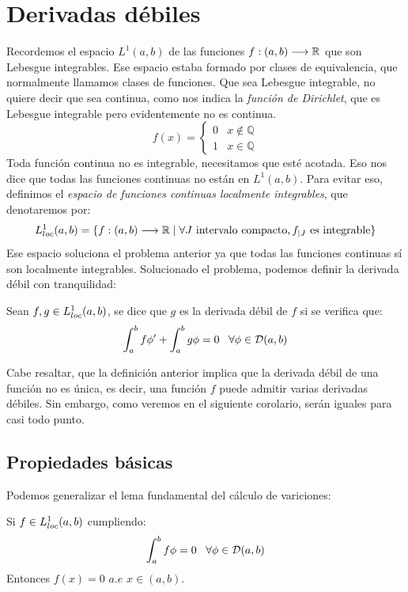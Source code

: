 \chapter{Derivadas débiles}

Recordemos el espacio $L^1(a,b)$ de las funciones $f : (a,b) \longrightarrow \mathbb{R}$ que son Lebesgue integrables. Ese espacio estaba formado por clases de equivalencia, que normalmente llamamos clases de funciones. Que sea Lebesgue integrable, no quiere decir que sea continua, como nos indica la \textit{función de Dirichlet}, que es Lebesgue integrable pero evidentemente no es continua.
\[
f(x)=\left\{
\begin{array}{cc}
0 & x\notin\mathbb{Q} \\
1 & x\in\mathbb{Q}
\end{array}
\right. 
\]
Toda función continua no es integrable, necesitamos que esté acotada. Eso nos dice que todas las funciones continuas no están en $L^1(a,b)$. Para evitar eso, definimos el \textit{espacio de funciones continuas localmente integrables}, que denotaremos por:
\[
L^1_{loc}(a,b)=\{f : (a,b) \longrightarrow \mathbb{R} \;|\; \forall J \text{ intervalo compacto},f_{|J}\text{ es integrable}\}
\]
Ese espacio soluciona el problema anterior ya que todas las funciones continuas sí son localmente integrables. Solucionado el problema, podemos definir la derivada débil con tranquilidad:

\begin{definition}
Sean $f,g\in L^1_{loc}(a,b)$, se dice que $g$ es la derivada débil de $f$ si se verifica que:
\[
\displaystyle\int_{ a }^{ b } f\phi'+\displaystyle\int_{ a }^{ b } g\phi=0 \;\;\; \forall\phi\in\mathcal{D}(a,b)
\]
\end{definition}

Cabe resaltar, que la definición anterior implica que la derivada débil de una función no es única, es decir, una función $f$ puede admitir varias derivadas débiles. Sin embargo, como veremos en el siguiente corolario, serán iguales para casi todo punto.

\section{Propiedades básicas}

Podemos generalizar el lema fundamental del cálculo de variciones:

\begin{lemma}
Si $f\in L^1_{loc}(a,b)$ cumpliendo:
\[
\displaystyle\int_{ a }^{ b } f\phi=0 \;\;\;\forall\phi\in\mathcal{D}(a,b)
\]
Entonces $f(x)=0$ $a.e$ $x\in(a,b)$.

\end{lemma}

